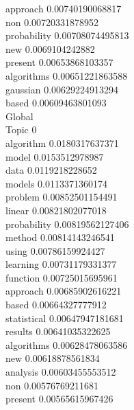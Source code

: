 \documentclass{article}
\begin{document}
approach 0.00740190068817\\
non 0.00720331878952\\
probability 0.00708074495813\\
new 0.0069104242882\\
present 0.00653868103357\\
algorithms 0.00651221863588\\
gaussian 0.00629224913294\\
based 0.00609463801093\\
Global\\
Topic 0\\
algorithm 0.0180317637371\\
model 0.0153512978987\\
data 0.0119218228652\\
models 0.0113371360174\\
problem 0.00852501154491\\
linear 0.00821802077018\\
probability 0.00819562127406\\
method 0.00814143246541\\
using 0.00786159924427\\
learning 0.00731179331377\\
function 0.00725015695961\\
approach 0.00685902616221\\
based 0.00664327777912\\
statistical 0.00647947181681\\
results 0.00641035322625\\
algorithms 0.00628478063586\\
new 0.00618878561834\\
analysis 0.00603455553512\\
non 0.00576769211681\\
present 0.00565615967426\\
\end{document}
